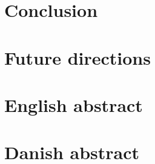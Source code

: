 \documentclass[a4paper, twoside]{report}
\begin{document}
\chapter{Conclusion}


\chapter{Future directions}


\chapter{English abstract}


\chapter{Danish abstract}







%

%

%


\newpage
\printbibliography[heading=bibintoc,
title={References}]
\newpage
\end{document}
